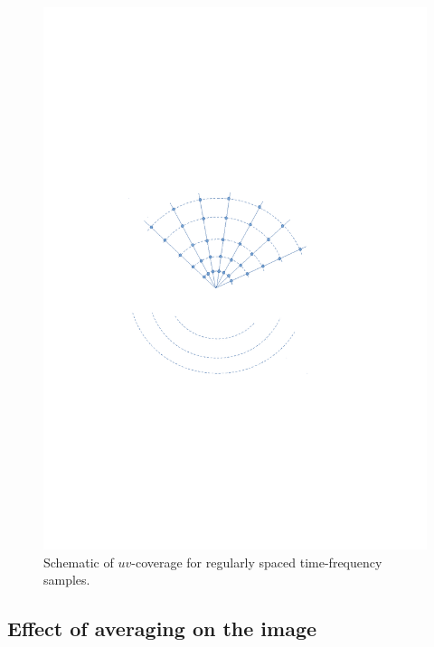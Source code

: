 \documentclass[useAMS,usenatbib]{mn2e}
\begin{document}
\begin{figure}
\includegraphics[width=1\columnwidth]{./Figures/uvcovmodify.pdf}\caption{Schematic of $uv$-coverage for 
regularly spaced time-frequency samples.}\label{fig:uvcov}
\end{figure}


\subsection{Effect of averaging on the image}
\label{sec:effectbw}
\end{document}
